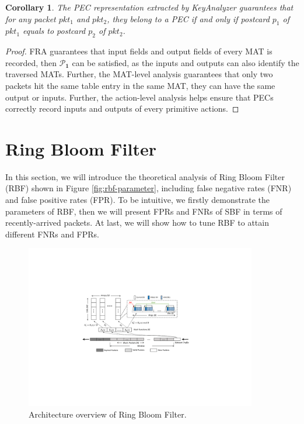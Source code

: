 \documentclass[sigconf, 10pt]{acmart}
\theoremstyle{plain}
\newtheorem{cor}{Corollary}
\begin{document}
\begin{cor}

The PEC representation extracted by KeyAnalyzer guarantees that for any packet $pkt_1$ and $pkt_2$, they belong to a PEC if and only if postcard $p_1$ of $pkt_1$ equals to postcard $p_2$ of $pkt_2$.

\end{cor}


\begin{proof}
    FRA guarantees that input fields and output fields of every MAT is recorded, then \textbf{$\bm{\mathcal{P}_1}$} can be satisfied, as the inputs and outputs can also identify the traversed MATs. Further, the MAT-level analysis guarantees that only two packets hit the same table entry in the same MAT, they can have the same output or inputs.
    Further, the action-level analysis helps ensure that PECs correctly record inputs and outputs of every primitive actions.

\end{proof}

\section{Ring Bloom Filter}

\newcommand{\Y}{{\color{red}$\checkmark$}}
\newcommand{\N}{{\color{green}\textbf{$\times$}}}

In this section, we will introduce the theoretical analysis of Ring Bloom Filter (RBF) shown in Figure \ref{fig:rbf-parameter}, including false negative rates (FNR) and false positive rates (FPR). 
To be intuitive, we firstly demonstrate the parameters of RBF, then we will present FPRs and FNRs of SBF in terms of recently-arrived packets. At last, we will show how to tune RBF to attain different FNRs and FPRs.

\begin{figure}[!htbp]
\centering
\includegraphics[width=0.9\textwidth]{graphs/rbf.pdf}
\caption{Architecture overview of Ring Bloom Filter.} 
\label{fig:evaluation}

\end{figure}
\end{document}
